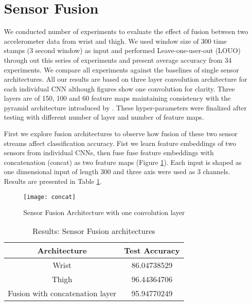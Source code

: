 \section*{Sensor Fusion}
\label{sec:fusion}
We conducted number of experiments to evaluate the effect of fusion between two accelerometer data from wrist and thigh. We used window size of 300 time stamps (3 second window) as input and performed Leave-one-user-out (LOUO) through out this series of experiments and present average accuracy from 34 experiments. We compare all experiments against the baselines of single sensor architectures. All our results are based on three layer convolution architecture for each individual CNN although figures show one convolution for clarity. Three layers are of 150, 100 and 60 feature maps maintaining consistency with the pyramid architecture introduced by . These hyper-parameters were finalized after testing with different number of layer and number of feature maps.

First we explore fusion architectures to observe how fusion of these two sensor streams affect classification accuracy. Fist we learn feature embeddings of two sensors from individual CNNs, then fuse fuse feature embeddings with concatenation (concat) as two feature maps (Figure \ref{fig:concat}). Each input is shaped as one dimensional input of length 300 and three axis were used as 3 channels. Results are presented in Table \ref{table:fusion1}.

\begin{figure}[ht]
\centering
\texttt{[image: concat]}
\caption{Sensor Fusion Architecture with one convolution layer}
\label{fig:concat}
\end{figure}

\begin{table}[ht]
\caption{Results: Sensor Fusion architectures }
\label{table:fusion1}
\begin{center}
\begin{tabular}{|c|c|} 
  \hline
  Architecture & Test Accuracy \\
  \hline
  Wrist & 86.04738529 \\
  \hline
  Thigh & 96.44364706 \\
  \hline
  Fusion with concatenation layer & 95.94770249 \\
  \hline
\end{tabular}
\end{center}
\end{table}

